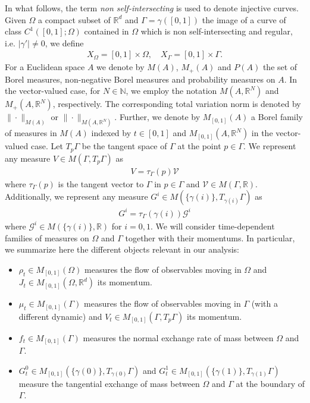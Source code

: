 \documentclass{article}
\def\R{{\mathbb R}}
\begin{document}
In what follows, the term \emph{non self-intersecting} is used to denote injective curves.
Given $\Omega$ a compact subset of $\R^d$ and $\Gamma = \gamma([0,1])$ the image of a curve of class $C^1([0,1];\Omega)$ contained in $\Omega$ which is non self-intersecting and regular, i.e. $\vert\gamma'\vert\neq 0$, we define
\begin{align*}
    X_\Omega = [0,1] \times \Omega, \quad X_\Gamma = [0,1] \times \Gamma.
\end{align*}
For a Euclidean space $A$ we denote by $M(A)$, $M_+(A)$ and $P(A)$ the set of Borel measures, non-negative Borel measures and probability measures on $A$. In the vector-valued case, for $N \in \mathbb{N}$, we employ the notation $M(A,\R^N)$ and $M_+(A,\R^N)$, respectively. The corresponding total variation norm is denoted by $\|\cdot\|_{M(A)}$ or $\|\cdot\|_{M(A, \R^N)}$.
Further, we denote by $M_{[0,1]}(A)$ a Borel family of measures in $M(A)$ indexed by $t \in [0,1]$ and $M_{[0,1]}(A, \R^N)$ in the vector-valued case.
Let $T_p\Gamma$ be the tangent space of $\Gamma$ at the point $p\in\Gamma$. We represent any measure $V \in M(\Gamma,T_p\Gamma)$ as 
\begin{align*}
  V = \tau_\Gamma(p) \mathcal{V}
\end{align*}
where $\tau_\Gamma(p)$ is the tangent vector to $\Gamma$ in $p \in \Gamma$ and $\mathcal{V}  \in M(\Gamma, \R)$. Additionally, we represent any measure $G^i \in M(\{\gamma(i)\}, T_{\gamma(i)} \Gamma)$ as
\begin{align*}
   G^i = \tau_{\Gamma}(\gamma(i)) \mathcal{G}^i 
\end{align*}
where $\mathcal{G}^i \in  M(\{\gamma(i)\}, \R)$ for $i=0,1$.
We will consider time-dependent families of measures on $\Omega$ and $\Gamma$ together with their momentums. In particular, we summarize here the different objects relevant in our analysis: 
\begin{itemize}
    \item[i)] $\rho_t \in M_{[0,1]}(\Omega)$ measures the flow of observables moving in $\Omega$ and $J_t \in M_{[0,1]}(\Omega,\R^d)$ its momentum.
    \item[ii)] $\mu_t \in M_{[0,1]}(\Gamma)$ measures the flow of observables moving in $\Gamma$ (with a different dynamic) and $V_t \in M_{[0,1]}(\Gamma,T_p\Gamma)$ its momentum.
    \item[iii)] $f_t \in M_{[0,1]}(\Gamma)$ measures the normal exchange rate of mass between $\Omega$ and $\Gamma$.
    \item[iv)] $G_t^0 \in M_{[0,1]}(\{\gamma(0)\},T_{\gamma(0)}\Gamma)$ and $G_t^1 \in M_{[0,1]}(\{\gamma(1)\},T_{\gamma(1)}\Gamma)$ measure the tangential exchange of mass between $\Omega$ and $\Gamma$ at the boundary of $\Gamma$.
\end{itemize}
\end{document}
